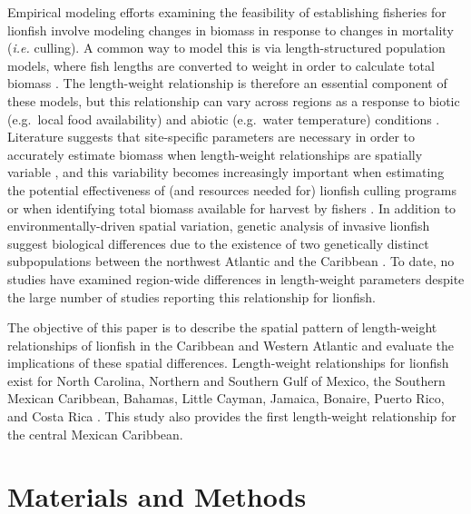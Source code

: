 \documentclass[fleqn,10pt,lineno]{wlpeerj} %
\begin{document}
Empirical modeling efforts examining the feasibility of establishing
fisheries for lionfish involve modeling changes in biomass in response
to changes in mortality (\emph{i.e.} culling). A common way to model
this is via length-structured population models, where fish lengths are
converted to weight in order to calculate total biomass
\citep{cote_2014,barbour_2011,andradibrown_2017}. The length-weight
relationship is therefore an essential component of these models, but
this relationship can vary across regions as a response to biotic
(e.g.~local food availability) and abiotic (e.g.~water temperature)
conditions \citep{johnson_2016}. Literature suggests that site-specific
parameters are necessary in order to accurately estimate biomass when
length-weight relationships are spatially variable , and this
variability becomes increasingly important when estimating the potential
effectiveness of (and resources needed for) lionfish culling programs or
when identifying total biomass available for harvest by fishers
\citep{barbour_2011,morris_2011,johnston_2015,chin_2016,cote_2014}. In
addition to environmentally-driven spatial variation, genetic analysis
of invasive lionfish suggest biological differences due to the existence
of two genetically distinct subpopulations between the northwest
Atlantic and the Caribbean \citep{betancurr_2011}. To date, no studies
have examined region-wide differences in length-weight parameters
despite the large number of studies reporting this relationship for
lionfish.

The objective of this paper is to describe the spatial pattern of
length-weight relationships of lionfish in the Caribbean and Western
Atlantic and evaluate the implications of these spatial differences.
Length-weight relationships for lionfish exist for North Carolina,
Northern and Southern Gulf of Mexico, the Southern Mexican Caribbean,
Bahamas, Little Cayman, Jamaica, Bonaire, Puerto Rico, and Costa Rica
\citep{barbour_2011,fogg_2013,dahl_2014,aguilarperera_2016,sabidoitza_2016,sabidoitz_2016,darling_2011,edwards_2014,chin_2016,deleon_2013,toledohernndez_2014,sandel_2015}.
This study also provides the first length-weight relationship for the
central Mexican Caribbean.

\clearpage

\section*{Materials and Methods}
\end{document}
